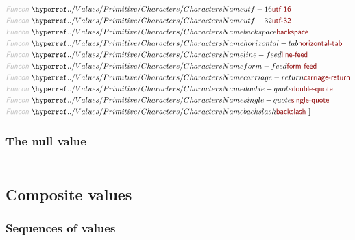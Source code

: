 \begin{align*}
  \KEY{Funcon} ~ & \NAMEHYPER{../Values/Primitive}{Characters}{utf-16} \\
  \KEY{Funcon} ~ & \NAMEHYPER{../Values/Primitive}{Characters}{utf-32} \\
  \KEY{Funcon} ~ & \NAMEHYPER{../Values/Primitive}{Characters}{backspace} \\
  \KEY{Funcon} ~ & \NAMEHYPER{../Values/Primitive}{Characters}{horizontal-tab} \\
  \KEY{Funcon} ~ & \NAMEHYPER{../Values/Primitive}{Characters}{line-feed} \\
  \KEY{Funcon} ~ & \NAMEHYPER{../Values/Primitive}{Characters}{form-feed} \\
  \KEY{Funcon} ~ & \NAMEHYPER{../Values/Primitive}{Characters}{carriage-return} \\
  \KEY{Funcon} ~ & \NAMEHYPER{../Values/Primitive}{Characters}{double-quote} \\
  \KEY{Funcon} ~ & \NAMEHYPER{../Values/Primitive}{Characters}{single-quote} \\
  \KEY{Funcon} ~ & \NAMEHYPER{../Values/Primitive}{Characters}{backslash}
  ~ ]
\end{align*}
\subsubsection*{The null value}\hypertarget{the-null-value}{}\label{the-null-value}

\begin{align*}
  [ ~ 
  \KEY{Datatype} ~ & \NAMEHYPER{../Values/Primitive}{Null}{null-type} \\
  \KEY{Funcon} ~ & \NAMEHYPER{../Values/Primitive}{Null}{null-value} \\
  \KEY{Alias} ~ & \NAMEHYPER{../Values/Primitive}{Null}{null}
  ~ ]
\end{align*}
\subsection*{Composite values}\hypertarget{composite-values}{}\label{composite-values}

\subsubsection*{Sequences of values}\hypertarget{sequences-of-values}{}\label{sequences-of-values}


